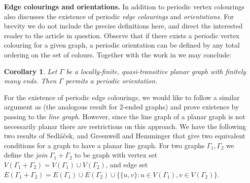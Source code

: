 \documentclass{article}
\numberwithin{equation}{section}
\newtheorem{corollary}[lemma]{Corollary}
\theoremstyle{definition}
\theoremstyle{remark}
\begin{document}
\textbf{Edge colourings and orientations.} In addition to periodic vertex colourings \cite{abrishami2025periodiccoloringsorientationsinfinite} also discusses the existence of periodic \textit{edge colourings} and \textit{orientations}. For brevity we do not include the precise definitions here, and direct the interested reader to the article in question. 
Observe that if there exists a periodic vertex colouring for a given graph, a periodic orientation can be defined by any total ordering on the set of colours. Together with the work in \cite{abrishami2025periodiccoloringsorientationsinfinite} we may conclude:
\begin{corollary}
    Let $\Gamma$ be a locally-finite, quasi-transitive planar graph with finitely many ends. Then $\Gamma$ permits a periodic orientation.
\end{corollary}
For the existence of periodic edge colourings, we would like to follow a similar argument as \cite[Corollary 5.5]{abrishami2025periodiccoloringsorientationsinfinite} (the analogous result for 2-ended graphs) and prove existence by passing to the \textit{line graph}. However, since the line graph of a planar graph is not necessarily planar there are restrictions on this approach.
We have the following two results of Sedláček, and Greenwell and Hemminger that give two equivalent conditions for a graph to have a planar line graph. 
For two graphs $\Gamma_1,\Gamma_2$ we
define the \textit{join} $\Gamma_1+\Gamma_2$ to be graph with vertex set $V(\Gamma_1+\Gamma_2)=V(\Gamma_1)\cup V(\Gamma_2)$, and edge set $E(\Gamma_1+\Gamma_2)=E(\Gamma_1)\cup E(\Gamma_2)\cup \{\{u,v\}:u\in V(\Gamma_1), v\in V(\Gamma_2)\}$.
\end{document}
